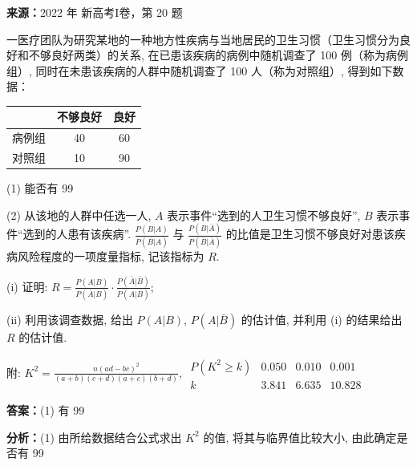 \begin{question}[points=12]
\textbf{来源：}2022 年 新高考I卷，第 20 题\par
一医疗团队为研究某地的一种地方性疾病与当地居民的卫生习惯（卫生习惯分为良好和不够良好两类）的关系, 在已患该疾病的病例中随机调查了 100 例（称为病例组）, 同时在未患该疾病的人群中随机调查了 100 人（称为对照组）, 得到如下数据：

\begin{center}\begin{tabular}{c|c|c}

 & 不够良好 & 良好 \\ \hline

病例组 & 40 & 60 \\

对照组 & 10 & 90 \\

\end{tabular}\end{center}

(1) 能否有 99%

(2) 从该地的人群中任选一人, $A$ 表示事件“选到的人卫生习惯不够良好”, $B$ 表示事件“选到的人患有该疾病”. $\frac{P(B|A)}{P(\bar{B}|A)}$ 与 $\frac{P(B|\bar{A})}{P(\bar{B}|\bar{A})}$ 的比值是卫生习惯不够良好对患该疾病风险程度的一项度量指标, 记该指标为 $R$.

(i) 证明: $R = \frac{P(A|B)}{P(\bar{A}|B)} \cdot \frac{P(\bar{A}|\bar{B})}{P(A|\bar{B})}$;

(ii) 利用该调查数据, 给出 $P(A|B)$, $P(A|\bar{B})$ 的估计值, 并利用 (i) 的结果给出 $R$ 的估计值.

附: $K^2 = \frac{n(ad - bc)^2}{(a+b)(c+d)(a+c)(b+d)}$, $\begin{array}{c|ccc} P(K^2 \ge k) & 0.050 & 0.010 & 0.001 \\ \hline k & 3.841 & 6.635 & 10.828 \end{array}$
\begin{solution}
\textbf{答案：}(1) 有 99%

\textbf{分析：}(1) 由所给数据结合公式求出 $K^2$ 的值, 将其与临界值比较大小, 由此确定是否有 99%


\end{solution}
\end{question}
